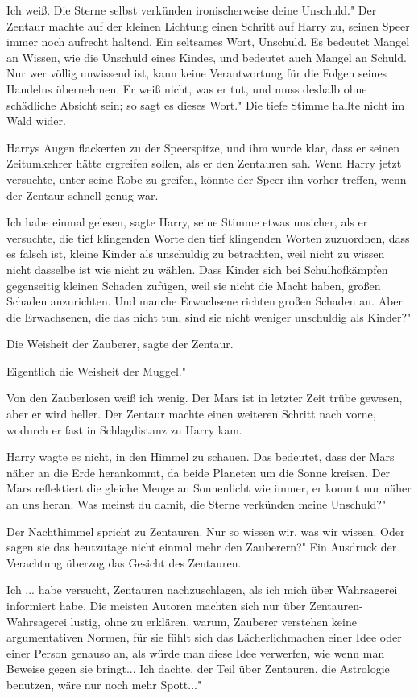\glqq Ich weiß. Die Sterne selbst verkünden ironischerweise deine Unschuld." Der
Zentaur machte auf der kleinen Lichtung einen Schritt auf Harry zu, seinen Speer
immer noch aufrecht haltend. \glqq Ein seltsames Wort, Unschuld. Es bedeutet
Mangel an Wissen, wie die Unschuld eines Kindes, und bedeutet auch Mangel an
Schuld. Nur wer völlig unwissend ist, kann keine Verantwortung für die Folgen
seines Handelns übernehmen. Er weiß nicht, was er tut, und muss deshalb ohne
schädliche Absicht sein; so sagt es dieses Wort." Die tiefe Stimme hallte nicht
im Wald wider.

Harrys Augen flackerten zu der Speerspitze, und ihm wurde klar, dass er seinen
Zeitumkehrer hätte ergreifen sollen, als er den Zentauren sah. Wenn Harry jetzt
versuchte, unter seine Robe zu greifen, könnte der Speer ihn vorher treffen,
wenn der Zentaur schnell genug war.

\glqq Ich habe einmal gelesen\grqq{}, sagte Harry, seine Stimme etwas unsicher,
als er versuchte, die tief klingenden Worte den tief klingenden Worten
zuzuordnen, \glqq dass es falsch ist, kleine Kinder als unschuldig zu
betrachten, weil nicht zu wissen nicht dasselbe ist wie nicht zu wählen. Dass
Kinder sich bei Schulhofkämpfen gegenseitig kleinen Schaden zufügen, weil sie
nicht die Macht haben, großen Schaden anzurichten. Und manche Erwachsene richten
großen Schaden an. Aber die Erwachsenen, die das nicht tun, sind sie nicht
weniger unschuldig als Kinder?"

\glqq Die Weisheit der Zauberer\grqq{}, sagte der Zentaur.

\glqq Eigentlich die Weisheit der Muggel."

\glqq Von den Zauberlosen weiß ich wenig. Der Mars ist in letzter Zeit trübe
gewesen, aber er wird heller.\grqq{} Der Zentaur machte einen weiteren Schritt
nach vorne, wodurch er fast in Schlagdistanz zu Harry kam.

Harry wagte es nicht, in den Himmel zu schauen. \glqq Das bedeutet, dass der
Mars näher an die Erde herankommt, da beide Planeten um die Sonne kreisen. Der
Mars reflektiert die gleiche Menge an Sonnenlicht wie immer, er kommt nur näher
an uns heran. Was meinst du damit, die Sterne verkünden meine Unschuld?"

\glqq Der Nachthimmel spricht zu Zentauren. Nur so wissen wir, was wir wissen.
Oder sagen sie das heutzutage nicht einmal mehr den Zauberern?" Ein Ausdruck der
Verachtung überzog das Gesicht des Zentauren.

\glqq Ich ... habe versucht, Zentauren nachzuschlagen, als ich mich über
Wahrsagerei informiert habe. Die meisten Autoren machten sich nur über
Zentauren-Wahrsagerei lustig, ohne zu erklären, warum, Zauberer verstehen keine
argumentativen Normen, für sie fühlt sich das Lächerlichmachen einer Idee oder
einer Person genauso an, als würde man diese Idee verwerfen, wie wenn man
Beweise gegen sie bringt... Ich dachte, der Teil über Zentauren, die Astrologie
benutzen, wäre nur noch mehr Spott..."

